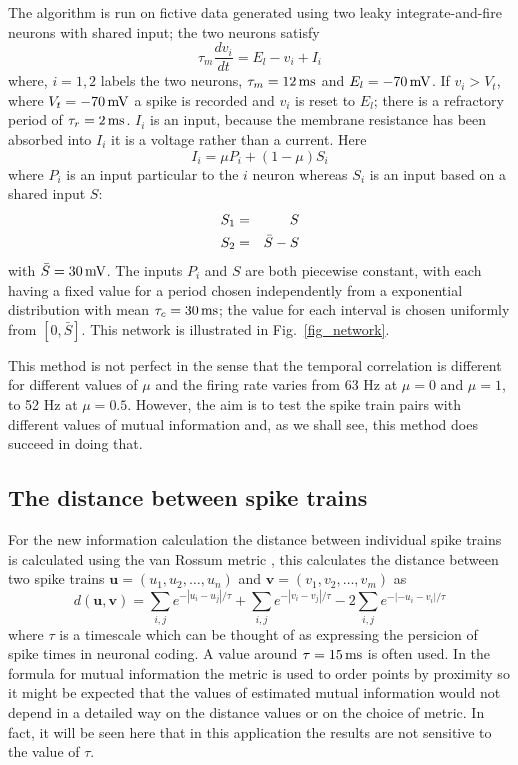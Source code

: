 \documentclass[12pt]{article}
\newcommand{\ms}{\mbox{\,ms}}
\newcommand{\mV}{\mbox{\,mV}}
\renewcommand{\u}{\mathbf{u}}
\renewcommand{\v}{\mathbf{v}}
\begin{document}
The algorithm is run on fictive data generated using two leaky
integrate-and-fire neurons with shared input; the two neurons satisfy
\begin{equation}
\tau_m \frac{dv_i}{dt}=E_l-v_i+I_i
\end{equation}
where, $i=1,2$ labels the two neurons, $\tau_m=12\ms$ and
$E_l=-70\mV$. If $v_i>V_t$, where $V_t=-70\mV$ a spike is recorded and
$v_i$ is reset to $E_l$; there is a refractory period of
$\tau_r=2\ms$. $I_i$ is an input, because the membrane resistance has
been absorbed into $I_i$ it is a voltage rather than a current. Here
\begin{equation}
I_i=\mu P_i +(1-\mu) S_i
\end{equation}
where $P_i$ is an input particular to the $i$ neuron whereas $S_i$ is an
input based on a shared input $S$:
\begin{eqnarray}
S_1&=&S\cr
S_2&=&\bar{S}-S
\end{eqnarray}
with $\bar{S}=30\mV$.  The inputs $P_i$ and $S$ are both piecewise
constant, with each having a fixed value for a period chosen
independently from a exponential distribution with mean
$\tau_c=30\ms$; the value for each interval is chosen uniformly from
$[0,\bar{S}]$. This network is illustrated in Fig.~\ref{fig_network}.

This method is not perfect in the sense that the temporal correlation
is different for different values of $\mu$ and the firing rate varies
from 63 Hz at $\mu=0$ and $\mu=1$, to 52 Hz at $\mu=0.5$. However, the
aim is to test the spike train pairs with different values of mutual
information and, as we shall see, this method does succeed in doing
that.

\subsection{The distance between spike trains}

For the new information calculation the distance between individual
spike trains is calculated using the van Rossum metric
\citep{vanRossum2001}, this calculates the distance between two spike
trains $\u=(u_1,u_2,\ldots,u_n)$ and
$\v=(v_1,v_2,\ldots,v_m)$ as
\begin{equation}
d(\u,\v)=\sum_{i,j} e^{-|u_i-u_j|/\tau}+\sum_{i,j} e^{-|v_i-v_j|/\tau}-2\sum_{i,j} e^{-|-u_i-v_i|/\tau}
\end{equation}
where $\tau$ is a timescale which can be thought of as expressing the
persicion of spike times in neuronal coding. A value around
$\tau=15\ms$ is often used. In the formula for mutual information the
metric is used to order points by proximity so it might be expected
that the values of estimated mutual information would not depend in a
detailed way on the distance values or on the choice of metric. In
fact, it will be seen here that in this application the results are
not sensitive to the value of $\tau$.
\end{document}

